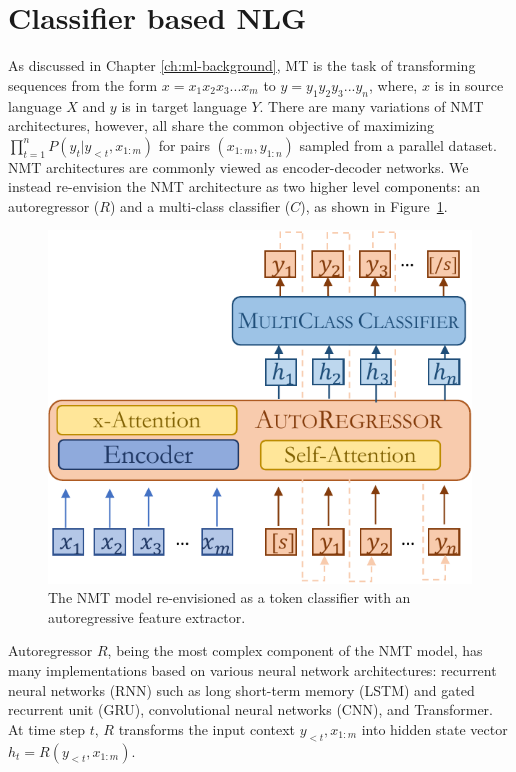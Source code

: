 \section{Classifier based NLG}
\label{sec:classifier-nlg}

As discussed in Chapter \ref{ch:ml-background}, MT is the task of transforming sequences from the form $x = x_1 x_2 x_3 ... x_m$ to $y = y_1 y_2 y_3 ... y_n$, where, $x$ is in source language $X$ and $y$ is in target language $Y$. 
There are many variations of NMT architectures, however, all share the common objective of maximizing ${ \prod_{t=1}^{n} P(y_t | y_{<t}, x_{1:m})}$ for pairs $(x_{1:m}, y_{1:n})$ sampled from a parallel dataset. 
NMT architectures are commonly viewed as encoder-decoder networks.
We instead re-envision the NMT architecture as two higher level components: an autoregressor ($R$) and a multi-class classifier ($C$), as shown in Figure~\ref{fig:nmt-architecture}.
\begin{figure}[ht]
    \centering
    \includegraphics[width=0.65\linewidth]{img/optimvocab/nmt-arch-classifier-new}
    \caption{The NMT model re-envisioned as a token classifier with an autoregressive feature extractor.}
    \label{fig:nmt-architecture}
\end{figure}

Autoregressor $R$, \cite{box2015time} being the most complex component of the NMT model, has many implementations based on various neural network architectures: recurrent neural networks (RNN) such as long short-term memory (LSTM) and gated recurrent unit (GRU), convolutional neural networks (CNN), and Transformer. 
At time step $t$, $R$ transforms the input context $y_{<t}, x_{1:m}$ into hidden state vector $h_t = R(y_{<t}, x_{1:m})$.

